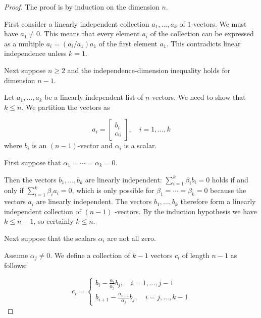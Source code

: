 \begin{proof}
    The proof is by induction on the dimension $n$.

    First consider a linearly independent collection $ a_{1}, \ldots, a_{k} $ of 1-vectors. We must have $ a_{1} \neq 0 $. This means that every element $ a_{i} $ of the collection can be expressed as a multiple $ a_{i}=\left(a_{i} / a_{1}\right) a_{1} $ of the first element $ a_{1} $. This contradicts linear independence unless $ k=1 $.

    Next suppose $ n \geq 2 $ and the independence-dimension inequality holds for dimension $ n-1 $. 
    
    Let $ a_{1}, \ldots, a_{k} $ be a linearly independent list of $ n $-vectors. We need to show that $ k \leq n $. We partition the vectors as

    \begin{equation}
    a_{i}=\left[\begin{array}{r}
    b_{i} \\
    \alpha_{i}
    \end{array}\right], \quad i=1, \ldots, k
    \end{equation}
    where $ b_{i} $ is an $ (n-1) $-vector and $ \alpha_{i} $ is a scalar.

    First suppose that $ \alpha_{1}=\cdots=\alpha_{k}=0 $. 
    
    Then the vectors $ b_{1}, \ldots, b_{k} $ are linearly independent: $ \sum_{i=1}^{k} \beta_{i} b_{i}=0 $ holds if and only if $ \sum_{i=1}^{k} \beta_{i} a_{i}=0 $, which is only possible for $ \beta_{1}=\cdots=\beta_{k}=0 $ because the vectors $ a_{i} $ are linearly independent. The vectors $ b_{1}, \ldots, b_{k} $ therefore form a linearly independent collection of $ (n-1) $ -vectors. By the induction hypothesis we have $ k \leq n-1 $, so certainly $ k \leq n $.

    Next suppose that the scalars $ \alpha_{i} $ are not all zero.
    
    Assume $ \alpha_{j} \neq 0 . $ We define a collection of $ k-1 $ vectors $ c_{i} $ of length $ n-1 $ as follows:

    \begin{equation}c_{i}=\left\{\begin{matrix} 
        b_{i}-\frac{\alpha_{i}}{\alpha_{j}} b_{j}, \quad i=1, \ldots, j-1  \\  
       b_{i+1}-\frac{\alpha_{i+1}}{\alpha_{j}} b_{j}, \quad i=j, \ldots, k-1  
     \end{matrix}\right. \end{equation}


\end{proof}

